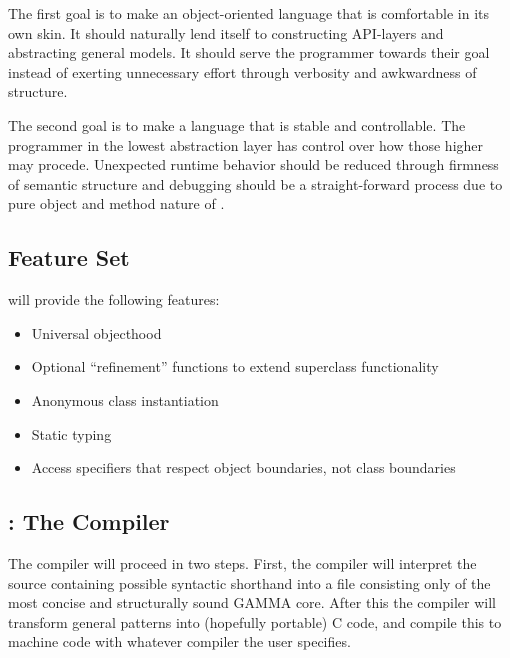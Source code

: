 The first goal is to make an object-oriented language that is comfortable
in its own skin. It should naturally lend itself to constructing API-layers
and abstracting general models. It should serve the programmer towards their
goal instead of exerting unnecessary effort through verbosity and awkwardness
of structure.


The second goal is to make a language that is stable and controllable.
The programmer in the lowest abstraction layer has control over how those
higher may procede. Unexpected runtime behavior should be reduced through
firmness of semantic structure and debugging should be a straight-forward
process due to pure object and method nature of \Lang{}.

\subsection{\Lang{} Feature Set}

\Lang{} will provide the following features:

\begin{itemize}
\item Universal objecthood
\item Optional ``refinement'' functions to extend superclass functionality
\item Anonymous class instantiation
\item Static typing
\item Access specifiers that respect object boundaries, not class boundaries
\end{itemize}

\subsection{\Compiler{}: The \Lang{} Compiler}

The compiler will proceed in two steps. First, the compiler will interpret
the source containing possible syntactic shorthand into a file
consisting only of the most concise and structurally sound GAMMA core. After this the compiler will transform
general patterns into (hopefully portable) C code, and compile this to
machine code with whatever compiler the user specifies.
